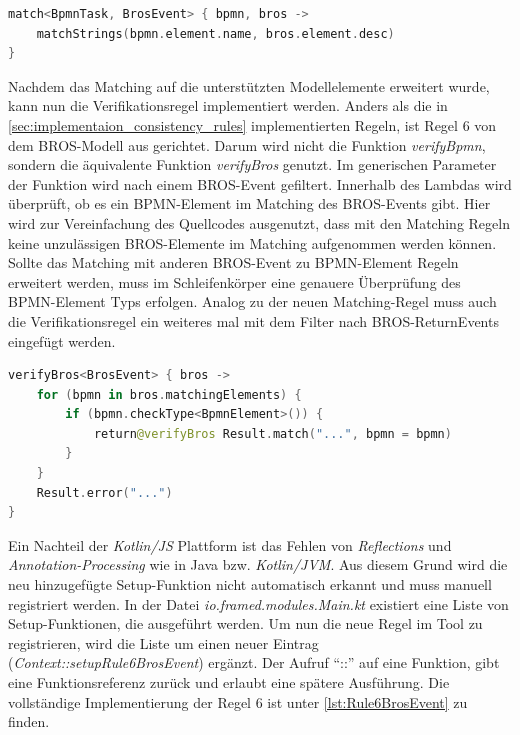 \begin{lstlisting}[language=Kotlin, caption=Matching Regel zwischen BPMN-Activities und BROS-Events, label=lst:matching_activity_event]
match<BpmnTask, BrosEvent> { bpmn, bros ->
    matchStrings(bpmn.element.name, bros.element.desc)
}
\end{lstlisting}

Nachdem das Matching auf die unterstützten Modellelemente erweitert wurde, kann nun die Verifikationsregel implementiert werden.
Anders als die in \cref{sec:implementaion_consistency_rules} implementierten Regeln, ist Regel 6 von dem BROS-Modell aus gerichtet.
Darum wird nicht die Funktion \emph{verifyBpmn}, sondern die äquivalente Funktion \emph{verifyBros} genutzt.
Im generischen Parameter der Funktion wird nach einem BROS-Event gefiltert.
Innerhalb des Lambdas wird überprüft, ob es ein BPMN-Element im Matching des BROS-Events gibt.
Hier wird zur Vereinfachung des Quellcodes ausgenutzt, dass mit den Matching Regeln keine unzulässigen BROS-Elemente im Matching aufgenommen werden können.
Sollte das Matching mit anderen BROS-Event zu BPMN-Element Regeln erweitert werden, muss im Schleifenkörper eine genauere Überprüfung des BPMN-Element Typs erfolgen.
Analog zu der neuen Matching-Regel muss auch die Verifikationsregel ein weiteres mal mit dem Filter nach BROS-ReturnEvents eingefügt werden.

\begin{lstlisting}[language=Kotlin, caption=Implementierung von Regel 6, label=lst:implementation_rule_6]
verifyBros<BrosEvent> { bros ->
    for (bpmn in bros.matchingElements) {
        if (bpmn.checkType<BpmnElement>()) {
            return@verifyBros Result.match("...", bpmn = bpmn)
        }
    }
    Result.error("...")
}
\end{lstlisting}

Ein Nachteil der \emph{Kotlin/JS} Plattform ist das Fehlen von \emph{Reflections} und \emph{Annotation-Processing} wie in Java bzw. \emph{Kotlin/JVM}.
Aus diesem Grund wird die neu hinzugefügte Setup-Funktion nicht automatisch erkannt und muss manuell registriert werden.
In der Datei \emph{io.framed.modules.Main.kt} existiert eine Liste von Setup-Funktionen, die ausgeführt werden.
Um nun die neue Regel im Tool zu registrieren, wird die Liste um einen neuer Eintrag (\emph{Context::setupRule6BrosEvent}) ergänzt.
Der Aufruf ``::'' auf eine Funktion, gibt eine Funktionsreferenz zurück und erlaubt eine spätere Ausführung.
Die vollständige Implementierung der Regel 6 ist unter \cref{lst:Rule6BrosEvent} zu finden.
